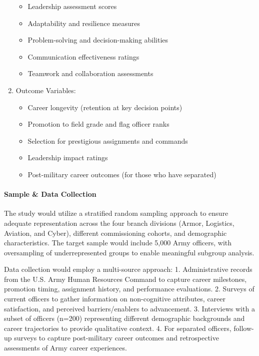 \documentclass[./main.tex]{subfiles}
\begin{document}
\begin{enumerate}
  \begin{itemize}
  \tightlist
  \item
    Leadership assessment scores
  \item
    Adaptability and resilience measures
  \item
    Problem-solving and decision-making abilities
  \item
    Communication effectiveness ratings
  \item
    Teamwork and collaboration assessments
  \end{itemize}
\item
  Outcome Variables:

  \begin{itemize}
  \tightlist
  \item
    Career longevity (retention at key decision points)
  \item
    Promotion to field grade and flag officer ranks
  \item
    Selection for prestigious assignments and commands
  \item
    Leadership impact ratings
  \item
    Post-military career outcomes (for those who have separated)
  \end{itemize}
\end{enumerate}

\paragraph{Sample \& Data Collection}\label{sample-data-collection}

The study would utilize a stratified random sampling approach to ensure
adequate representation across the four branch divisions (Armor,
Logistics, Aviation, and Cyber), different commissioning cohorts, and
demographic characteristics. The target sample would include 5,000 Army
officers, with oversampling of underrepresented groups to enable
meaningful subgroup analysis.

Data collection would employ a multi-source approach: 1. Administrative
records from the U.S. Army Human Resources Command to capture career
milestones, promotion timing, assignment history, and performance
evaluations. 2. Surveys of current officers to gather information on
non-cognitive attributes, career satisfaction, and perceived
barriers/enablers to advancement. 3. Interviews with a subset of
officers (n=200) representing different demographic backgrounds and
career trajectories to provide qualitative context. 4. For separated
officers, follow-up surveys to capture post-military career outcomes and
retrospective assessments of Army career experiences.
\end{document}
